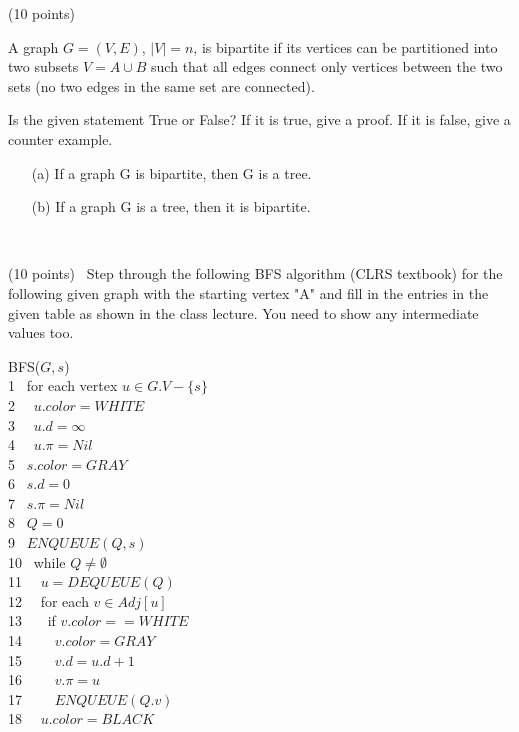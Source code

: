 \documentclass[12pt]{article}
\newcommand{\vs}{\vspace{2mm}}
\newcommand{\ha}{\hspace{1mm}}
\begin{document}
 (10 points)
\vs\

A graph $G = (V, E)$, $|V|=n$, is bipartite if its vertices can be partitioned into two subsets $V = A \cup B$ such that all edges connect only vertices between the two sets (no two edges in the same set are
connected).


 
 Is the given statement True or False? If it is true, give a proof. If it is false, give a counter example.
\begin{itemize}
\item[(a)]
If a graph G is bipartite, then G is a tree.

 \item[(b)]
 If a graph G is a tree, then it is bipartite.


\end{itemize}

\vs\

 (10 points)
\vs\
Step through the following  BFS algorithm (CLRS textbook) for the following given graph with the starting vertex "A" and fill in the entries in the given table as shown in the class lecture. You need to show any intermediate values too.


BFS($G,s$) \\
1 \ha\ for each vertex $u \in G.V - \{s\}$\\
2 \ha\ \ha\ $u.color = WHITE$ \\
3 \ha\ \ha\ $u.d = \infty$ \\
4 \ha\ \ha\  $u.\pi = Nil$ \\
5 \ha\  $s.color= GRAY$ \\
6 \ha\ $s.d =0$ \\
7 \ha\ $s.\pi = Nil$ \\
8 \ha\ $Q=0$ \\
9 \ha\ $ENQUEUE(Q,s)$ \\
10 \ha\ while $Q \neq \emptyset $ \\
11 \ha\ \ha\ $u= DEQUEUE(Q)$ \\
12 \ha\ \ha\ for each $v \in Adj[u] $ \\
13 \ha\ \ha\ \ha\ if $v.color == WHITE$ \\
14 \ha\ \ha\ \ha\ \ha\ $v.color = GRAY $\\
15 \ha\ \ha\ \ha\ \ha\ $v.d= u.d +1 $\\
16 \ha\ \ha\ \ha\ \ha\ $v.\pi= u$\\
17 \ha\ \ha\ \ha\ \ha\ $ENQUEUE(Q.v) $\\
18 \ha\ \ha\ $u.color = BLACK$ \\
\end{document}

